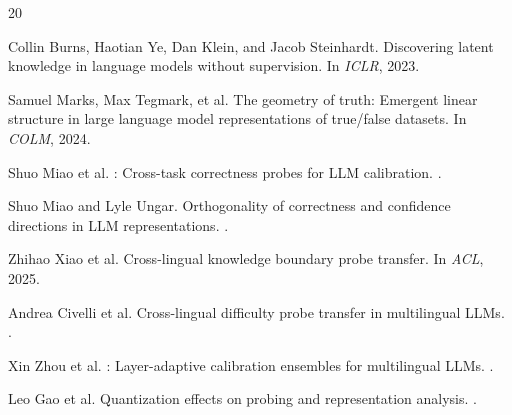 \documentclass[11pt,a4paper]{article}
\begin{document}
\begin{thebibliography}{20}

Collin Burns, Haotian Ye, Dan Klein, and Jacob Steinhardt.
\newblock Discovering latent knowledge in language models without supervision.
\newblock In \emph{ICLR}, 2023.

Samuel Marks, Max Tegmark, et al.
\newblock The geometry of truth: Emergent linear structure in large language model representations of true/false datasets.
\newblock In \emph{COLM}, 2024.

Shuo Miao et al.
: Cross-task correctness probes for LLM calibration.
.

Shuo Miao and Lyle Ungar.
\newblock Orthogonality of correctness and confidence directions in LLM representations.
.

Zhihao Xiao et al.
\newblock Cross-lingual knowledge boundary probe transfer.
\newblock In \emph{ACL}, 2025.

Andrea Civelli et al.
\newblock Cross-lingual difficulty probe transfer in multilingual LLMs.
.

Xin Zhou et al.
: Layer-adaptive calibration ensembles for multilingual LLMs.
.

Leo Gao et al.
\newblock Quantization effects on probing and representation analysis.
.

\end{thebibliography}
\end{document}
